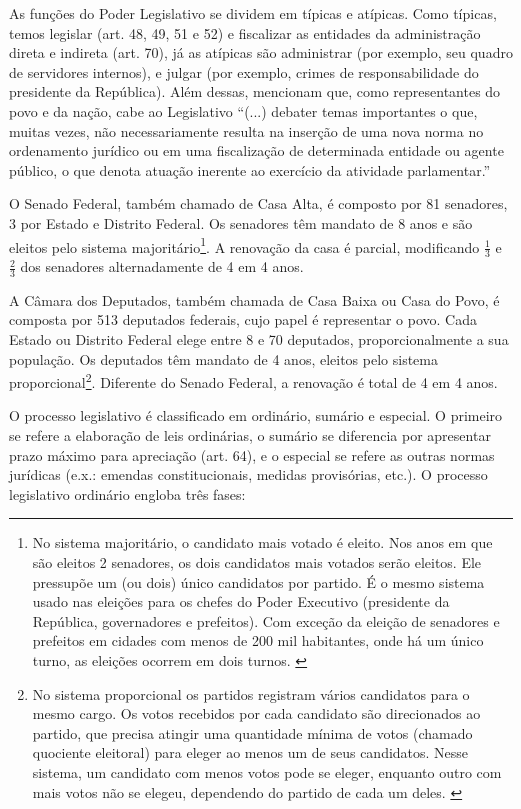\documentclass[a4paper,titlepage]{ppgi}\usepackage[]{graphicx}\usepackage[]{color}
\begin{document}
As funções do Poder Legislativo se dividem em típicas e atípicas. Como típicas,
temos legislar (art. 48, 49, 51 e 52) e fiscalizar as entidades da
administração direta e indireta (art. 70), já as atípicas são administrar (por
exemplo, seu quadro de servidores internos), e julgar (por exemplo, crimes de
responsabilidade do presidente da República). Além dessas,
 mencionam que, como representantes do povo e da
nação, cabe ao Legislativo ``(...) debater temas importantes o que, muitas
vezes, não necessariamente resulta na inserção de uma nova norma no ordenamento
jurídico ou em uma fiscalização de determinada entidade ou agente público, o
que denota atuação inerente ao exercício da atividade parlamentar.''

O Senado Federal, também chamado de Casa Alta, é composto por 81 senadores, 3
por Estado e Distrito Federal. Os senadores têm mandato de 8 anos e são eleitos
pelo sistema majoritário\footnote{No sistema majoritário, o candidato mais
votado é eleito. Nos anos em que são eleitos 2 senadores, os dois candidatos
mais votados serão eleitos. Ele pressupõe um (ou dois) único candidatos por
partido. É o mesmo sistema usado nas eleições para os chefes do Poder Executivo
(presidente da República, governadores e prefeitos). Com exceção da eleição de
senadores e prefeitos em cidades com menos de 200 mil habitantes, onde há um
único turno, as eleições ocorrem em dois turnos. \cite{Carneiro2013}}. A
renovação da casa é parcial, modificando $\frac{1}{3}$ e $\frac{2}{3}$ dos
senadores alternadamente de 4 em 4 anos.

A Câmara dos Deputados, também chamada de Casa Baixa ou Casa do Povo, é
composta por 513 deputados federais, cujo papel é representar o povo. Cada
Estado ou Distrito Federal elege entre 8 e 70 deputados, proporcionalmente a
sua população. Os deputados têm mandato de 4 anos, eleitos pelo sistema
proporcional\footnote{No sistema proporcional os partidos registram vários
candidatos para o mesmo cargo. Os votos recebidos por cada candidato são
direcionados ao partido, que precisa atingir uma quantidade mínima de votos
(chamado quociente eleitoral) para eleger ao menos um de seus candidatos. Nesse
sistema, um candidato com menos votos pode se eleger, enquanto outro com mais
votos não se elegeu, dependendo do partido de cada um deles.
\cite{Carneiro2013,Bramatti2014}}. Diferente do Senado Federal, a renovação é
total de 4 em 4 anos.

O processo legislativo é classificado em ordinário, sumário e especial. O
primeiro se refere a elaboração de leis ordinárias, o sumário se diferencia por
apresentar prazo máximo para apreciação (art. 64), e o especial se refere as
outras normas jurídicas (e.x.: emendas constitucionais, medidas provisórias,
etc.). O processo legislativo ordinário engloba três fases:
\end{document}
